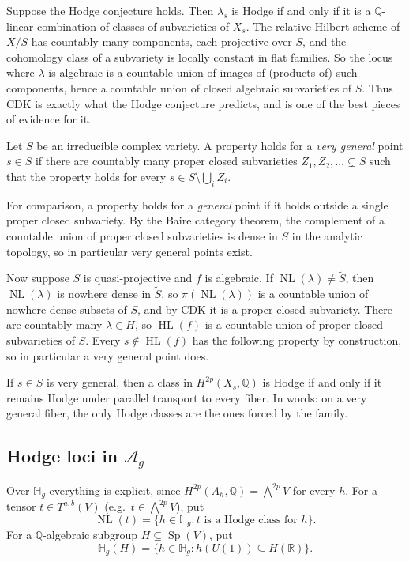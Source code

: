 \documentclass[12pt]{amsart}
\newcommand{\R}{\mathbb{R}}
\newcommand{\Q}{\mathbb{Q}}
\DeclareMathOperator{\Sp}{Sp}
\DeclareMathOperator{\NL}{NL}
\DeclareMathOperator{\HL}{HL}
\newcommand{\cA}{\mathcal{A}}
\newcommand{\HH}{\mathbb{H}}
\newcommand{\wt}{\widetilde}
\let\oldbigwedge\bigwedge
\renewcommand{\bigwedge}{\mathop{\textstyle\oldbigwedge}\nolimits}
\theoremstyle{definition}
\theoremstyle{remark}
\numberwithin{equation}{section}
\begin{document}
\begin{remark}
    Suppose the Hodge conjecture holds. Then $\lambda_s$ is Hodge if and only
    if it is a $\Q$-linear combination of classes of subvarieties of $X_s$. The
    relative Hilbert scheme of $X/S$ has countably many components, each
    projective over $S$, and the cohomology class of a subvariety is locally
    constant in flat families. So the locus where $\lambda$ is algebraic is a
    countable union of images of (products of) such components, hence a
    countable union of closed algebraic subvarieties of $S$. Thus CDK is
    exactly what the Hodge conjecture predicts, and is one of the best pieces
    of evidence for it.
\end{remark}

\begin{definition}
    Let $S$ be an irreducible complex variety. A property holds for a
    \emph{very general} point $s \in S$ if there are countably many proper
    closed subvarieties $Z_1, Z_2, \ldots \subsetneq S$ such that the property
    holds for every $s \in S \setminus \bigcup_i Z_i$.
\end{definition}

For comparison, a property holds for a \emph{general} point if it holds
outside a single proper closed subvariety. By the Baire category theorem, the
complement of a countable union of proper closed subvarieties is dense in $S$
in the analytic topology, so in particular very general points exist.

Now suppose $S$ is quasi-projective and $f$ is algebraic. If
$\NL(\lambda) \neq \wt{S}$, then $\NL(\lambda)$ is nowhere dense in $\wt{S}$,
so $\pi(\NL(\lambda))$ is a countable union of nowhere dense subsets of $S$,
and by CDK it is a proper closed subvariety. There are countably many
$\lambda \in H$, so $\HL(f)$ is a countable union of proper closed
subvarieties of $S$. Every $s \notin \HL(f)$ has the following property by
construction, so in particular a very general point does.

\begin{lemma}
    If $s \in S$ is very general, then a class in $H^{2p}(X_s, \Q)$ is Hodge if
    and only if it remains Hodge under parallel transport to every fiber. In
    words: on a very general fiber, the only Hodge classes are the ones forced
    by the family.
\end{lemma}

\subsection{Hodge loci in \texorpdfstring{$\cA_g$}{A\_g}}
Over $\HH_g$ everything is explicit, since $H^{2p}(A_h, \Q) = \bigwedge^{2p} V$
for every $h$. For a tensor $t \in T^{a,b}(V)$ (e.g.\ $t \in \bigwedge^{2p}V$),
put
\begin{equation*}
    \NL(t) = \{h \in \HH_g : t \text{ is a Hodge class for } h\}.
\end{equation*}
For a $\Q$-algebraic subgroup $H \subseteq \Sp(V)$, put
\begin{equation*}
    \HH_g(H) = \{h \in \HH_g : h(U(1)) \subseteq H(\R)\}.
\end{equation*}
\end{document}
